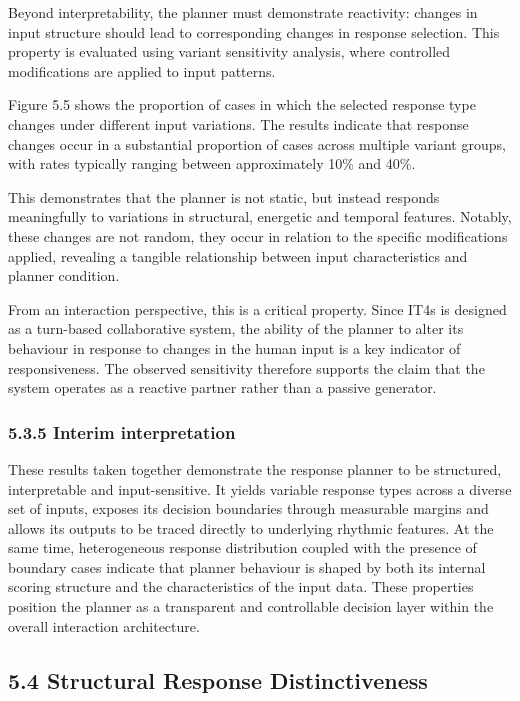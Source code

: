 Beyond interpretability, the planner must demonstrate reactivity:
changes in input structure should lead to corresponding changes in
response selection. This property is evaluated using variant sensitivity
analysis, where controlled modifications are applied to input patterns.

Figure 5.5 shows the proportion of cases in which the selected response
type changes under different input variations. The results indicate that
response changes occur in a substantial proportion of cases across
multiple variant groups, with rates typically ranging between
approximately 10\% and 40\%.

This demonstrates that the planner is not static, but instead responds
meaningfully to variations in structural, energetic and temporal
features. Notably, these changes are not random, they occur in relation
to the specific modifications applied, revealing a tangible relationship
between input characteristics and planner condition.

From an interaction perspective, this is a critical property. Since IT4s
is designed as a turn-based collaborative system, the ability of the
planner to alter its behaviour in response to changes in the human input
is a key indicator of responsiveness. The observed sensitivity therefore
supports the claim that the system operates as a reactive partner rather
than a passive generator.

\subsubsection{5.3.5 Interim
interpretation}\label{interim-interpretation}

These results taken together demonstrate the response planner to be
structured, interpretable and input-sensitive. It yields variable
response types across a diverse set of inputs, exposes its decision
boundaries through measurable margins and allows its outputs to be
traced directly to underlying rhythmic features. At the same time,
heterogeneous response distribution coupled with the presence of
boundary cases indicate that planner behaviour is shaped by both its
internal scoring structure and the characteristics of the input data.
These properties position the planner as a transparent and controllable
decision layer within the overall interaction architecture.

\subsection{5.4 Structural Response
Distinctiveness}\label{structural-response-distinctiveness}

